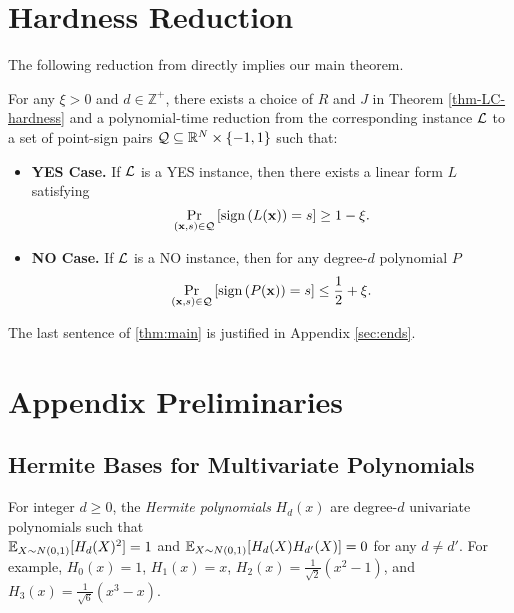 \section{Hardness Reduction}\label{sec:reduction}



The following reduction from \LC  directly implies our main theorem.
\begin{theorem}\label{thm-hardness-redn}
For any $\xi > 0$ and $d \in \mathbb{Z}^+$, there exists a choice of $R$ and $J$ in Theorem \ref{thm-LC-hardness} and
a  polynomial-time reduction from the corresponding \LC instance $\mathcal{L}$ to a set of point-sign pairs $\mathcal{Q} \subseteq \mathbb{R}^N\times \{-1,1\}$ such that:
\begin{itemize}
\item \textbf{YES Case.} If $\mathcal{L}$ is a YES instance, then there exists
a linear form $L$ satisfying
$$\Pr_{({\bf x}, s) \in \mc{Q}} \left[\tn{sign}\left(L({\bf x})\right) = s\right]
\geq 1 - \xi.$$

\item \textbf{NO Case.} If $\mathcal{L}$ is a NO instance, then for any degree-$d$
polynomial $P$
$$\Pr_{({\bf x}, s) \in \mc{Q}} \left[\tn{sign}\left(P({\bf x})\right) = s\right]
\leq \frac{1}{2} + \xi.$$
\end{itemize}

\end{theorem} 


The last sentence of \cref{thm:main} is justified in Appendix \ref{sec:ends}.



\appendix

\section{Appendix Preliminaries}


\subsection{Hermite Bases for Multivariate Polynomials}
For integer $d \geq 0$, the {\em Hermite polynomials} $H_d(x)$ are degree-$d$ univariate polynomials such that \\ $\mathbb{E}_{X \sim N(0,1)}[H_d(X)^2]=1$ and $\mathbb{E}_{X \sim N(0,1)}[H_d(X) H_{d'}(X)]=0$ for any $d \neq d'$. For example, $H_0(x) = 1$, $H_1(x) = x$, $H_2(x) = \frac{1}{\sqrt{2}}(x^2 - 1)$, and $H_3(x) = \frac{1}{\sqrt{6}}(x^3 - x)$. 

